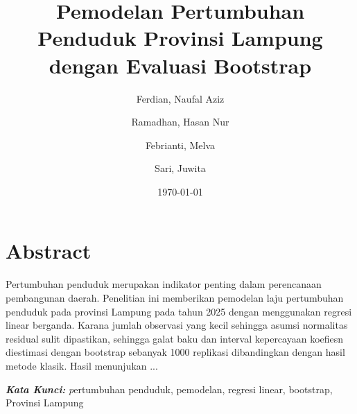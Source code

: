 \documentclass[12pt,a4paper]{article}
\title{Pemodelan Pertumbuhan Penduduk Provinsi Lampung dengan Evaluasi Bootstrap}
\author{Ferdian, Naufal Aziz \and Ramadhan, Hasan Nur \and Febrianti, Melva \and Sari, Juwita}
\date{\today}
\begin{document}
\maketitle

{
	\centering
	\section*{Abstract}
	Pertumbuhan penduduk merupakan indikator penting dalam perencanaan
	pembangunan daerah.	Penelitian ini memberikan pemodelan laju pertumbuhan
	penduduk pada provinsi Lampung pada tahun 2025 dengan menggunakan regresi
	linear berganda. Karana jumlah observasi yang kecil sehingga asumsi normalitas
	residual sulit dipastikan, sehingga galat baku dan interval kepercayaan koefiesn
	diestimasi dengan bootstrap sebanyak 1000 replikasi dibandingkan dengan hasil
	metode klasik. Hasil menunjukan ...
}


\noindent\textbf{\textit{Kata Kunci:}} {\textit pertumbuhan penduduk, pemodelan, regresi linear, bootstrap, Provinsi Lampung}
\end{document}
